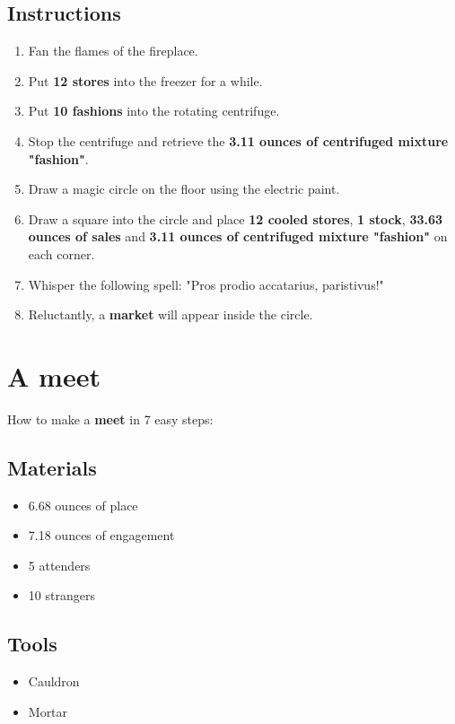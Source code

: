 \documentclass{article}
\begin{document}
\subsection{Instructions}\begin{enumerate}
\item 
Fan the flames of the fireplace.
\item 
Put \textbf{12 stores} into the freezer for a while.
\item 
Put \textbf{10 fashions} into the rotating centrifuge.
\item 
Stop the centrifuge and retrieve the \textbf{3.11 ounces of centrifuged mixture "fashion"}.
\item 
Draw a magic circle on the floor using the electric paint.
\item 
Draw a square into the circle and place \textbf{12 cooled stores}, \textbf{1 stock}, \textbf{33.63 ounces of sales} and \textbf{3.11 ounces of centrifuged mixture "fashion"} on each corner.
\item 
Whisper the following spell: "Pros prodio accatarius, paristivus!"
\item 
Reluctantly, a \textbf{market} will appear inside the circle.
\end{enumerate}
\newpage
\section{A meet}How to make a \textbf{meet} in 7 easy steps:

\subsection{Materials}\begin{itemize}
\item 
6.68 ounces of place
\item 
7.18 ounces of engagement
\item 
5 attenders
\item 
10 strangers
\end{itemize}
\subsection{Tools}\begin{itemize}
\item 
Cauldron
\item 
Mortar
\end{itemize}
\end{document}
